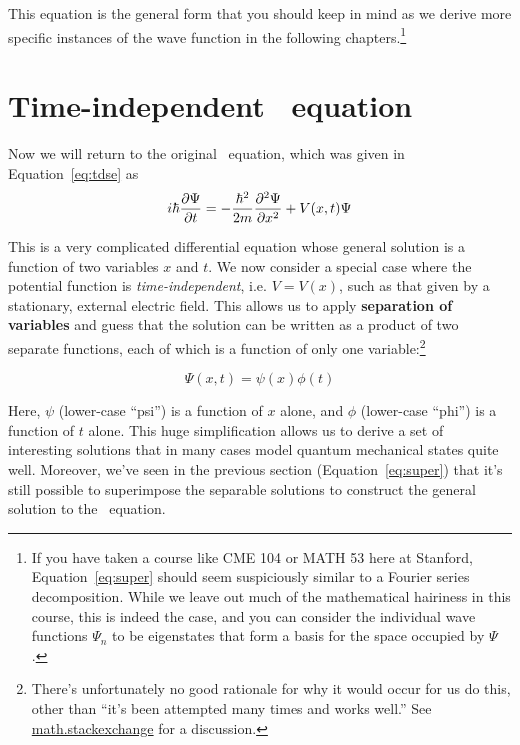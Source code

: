 This equation is the general form that you should keep in mind as we derive more specific instances of the wave function in the following chapters.\footnote{If you have taken a course like CME 104 or MATH 53 here at Stanford, Equation~\ref{eq:super} should seem suspiciously similar to a Fourier series decomposition. While we leave out much of the mathematical hairiness in this course, this is indeed the case, and you can consider the individual wave functions $\Psi_n$ to be eigenstates that form a basis for the space occupied by $\Psi$.}

\section[Time-independence]{Time-independent \Sch\ equation}
Now we will return to the original \Sch\ equation, which was given in Equation~\ref{eq:tdse} as
\begin{equation*}
	i\hbar \pdv{\Psi}{t} = -\frac{\hbar^2}{2m} \pdv[2]{\Psi}{x} + V(x,t)\Psi
\end{equation*}

This is a very complicated differential equation whose general solution is a function of two variables $x$ and $t$. We now consider a special case where the potential function is \emph{time-independent}, i.e. $V=V(x)$, such as that given by a stationary, external electric field. This allows us to apply \textbf{separation of variables} and guess that the solution can be written as a product of two separate functions, each of which is a function of only one variable:\footnote{There's unfortunately no good rationale for why it would occur for us do this, other than ``it's been attempted many times and works well.'' See \href{https://math.stackexchange.com/questions/575205/why-separation-of-variables-works-in-pdes}{math.stackexchange} for a discussion.} 
\begin{tcolorbox}[title = Separation of variables] \vspace{-2ex}
\begin{equation}
	\Psi(x,t) = \psi(x)\phi(t) \label{eq:sep}
\end{equation}
\end{tcolorbox}

Here, $\psi$ (lower-case ``psi'') is a function of $x$ alone, and $\phi$ (lower-case ``phi'') is a function of $t$ alone. This huge simplification allows us to derive a set of interesting solutions that in many cases model quantum mechanical states quite well. Moreover, we've seen in the previous section (Equation~\ref{eq:super}) that it's still possible to superimpose the separable solutions to construct the general solution to the \Sch\ equation. \par

